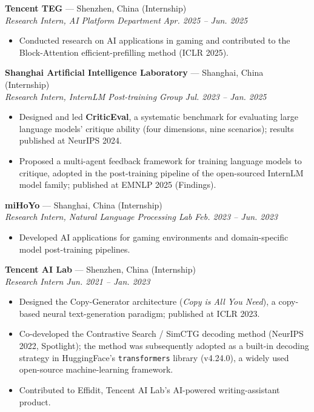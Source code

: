 \documentclass[10.5pt]{article}
\begin{document}
\vspace{4pt}
\textbf{Tencent TEG} --- Shenzhen, China {\small\color{muted}(Internship)}\\
\textit{Research Intern, AI Platform Department} \hfill \textit{Apr. 2025 -- Jun. 2025}
\begin{itemize}
  \item Conducted research on AI applications in gaming and contributed to the Block-Attention efficient-prefilling method (ICLR 2025).
\end{itemize}

\vspace{4pt}
\textbf{Shanghai Artificial Intelligence Laboratory} --- Shanghai, China {\small\color{muted}(Internship)}\\
\textit{Research Intern, InternLM Post-training Group} \hfill \textit{Jul. 2023 -- Jan. 2025}
\begin{itemize}
  \item Designed and led \textbf{CriticEval}, a systematic benchmark for evaluating large language models' critique ability (four dimensions, nine scenarios); results published at NeurIPS 2024.
  \item Proposed a multi-agent feedback framework for training language models to critique, adopted in the post-training pipeline of the open-sourced InternLM model family; published at EMNLP 2025 (Findings).
\end{itemize}

\vspace{4pt}
\textbf{miHoYo} --- Shanghai, China {\small\color{muted}(Internship)}\\
\textit{Research Intern, Natural Language Processing Lab} \hfill \textit{Feb. 2023 -- Jun. 2023}
\begin{itemize}
  \item Developed AI applications for gaming environments and domain-specific model post-training pipelines.
\end{itemize}

\vspace{4pt}
\textbf{Tencent AI Lab} --- Shenzhen, China {\small\color{muted}(Internship)}\\
\textit{Research Intern} \hfill \textit{Jun. 2021 -- Jan. 2023}
\begin{itemize}
  \item Designed the Copy-Generator architecture (\textit{Copy is All You Need}), a copy-based neural text-generation paradigm; published at ICLR 2023.
  \item Co-developed the Contrastive Search / SimCTG decoding method (NeurIPS 2022, Spotlight); the method was subsequently adopted as a built-in decoding strategy in HuggingFace's \texttt{transformers} library (v4.24.0), a widely used open-source machine-learning framework.
  \item Contributed to Effidit, Tencent AI Lab's AI-powered writing-assistant product.
\end{itemize}
\end{document}
